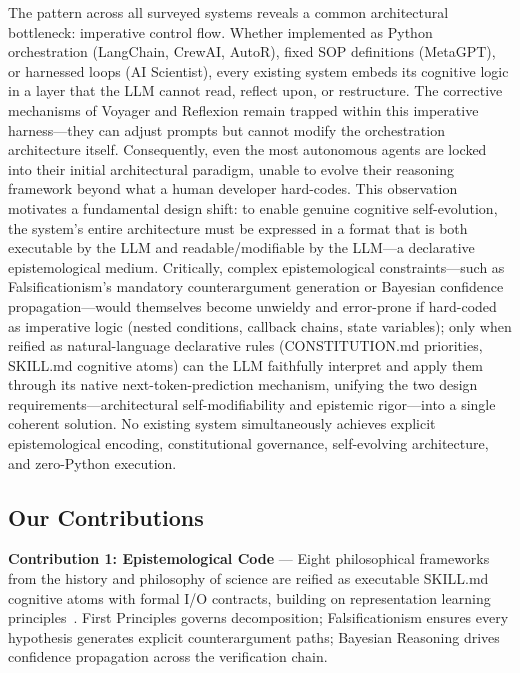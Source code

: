 \documentclass[review]{elsarticle}
\begin{document}
The pattern across all surveyed systems reveals a common architectural bottleneck: imperative control flow. Whether implemented as Python orchestration (LangChain, CrewAI, AutoR), fixed SOP definitions (MetaGPT), or harnessed loops (AI Scientist), every existing system embeds its cognitive logic in a layer that the LLM cannot read, reflect upon, or restructure. The corrective mechanisms of Voyager and Reflexion remain trapped within this imperative harness---they can adjust prompts but cannot modify the orchestration architecture itself. Consequently, even the most autonomous agents are locked into their initial architectural paradigm, unable to evolve their reasoning framework beyond what a human developer hard-codes. This observation motivates a fundamental design shift: to enable genuine cognitive self-evolution, the system's entire architecture must be expressed in a format that is both executable by the LLM and readable/modifiable by the LLM---a declarative epistemological medium. Critically, complex epistemological constraints---such as Falsificationism's mandatory counterargument generation or Bayesian confidence propagation---would themselves become unwieldy and error-prone if hard-coded as imperative logic (nested conditions, callback chains, state variables); only when reified as natural-language declarative rules (CONSTITUTION.md priorities, SKILL.md cognitive atoms) can the LLM faithfully interpret and apply them through its native next-token-prediction mechanism, unifying the two design requirements---architectural self-modifiability and epistemic rigor---into a single coherent solution. No existing system simultaneously achieves explicit epistemological encoding, constitutional governance, self-evolving architecture, and zero-Python execution.

\subsection{Our Contributions}
\label{sec:contributions}

\textbf{Contribution 1: Epistemological Code} --- Eight philosophical frameworks from the history and philosophy of science are reified as executable SKILL.md cognitive atoms with formal I/O contracts, building on representation learning principles~\cite{bengio2013representation}. First Principles governs decomposition; Falsificationism ensures every hypothesis generates explicit counterargument paths; Bayesian Reasoning drives confidence propagation across the verification chain.
\end{document}
